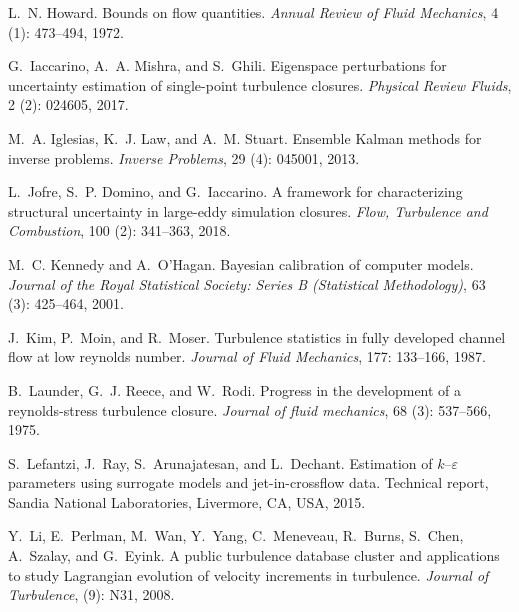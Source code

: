 \documentclass[a4paper]{ar-1col}
\begin{document}
\begin{thebibliography}{82}
L.~N. Howard.
\newblock Bounds on flow quantities.
\newblock \emph{Annual Review of Fluid Mechanics}, 4 (1):
  473--494, 1972.

G.~Iaccarino, A.~A. Mishra, and S.~Ghili.
\newblock Eigenspace perturbations for uncertainty estimation of single-point
  turbulence closures.
\newblock \emph{Physical Review Fluids}, 2 (2): 024605, 2017.

M.~A. Iglesias, K.~J. Law, and A.~M. Stuart.
\newblock Ensemble {Kalman} methods for inverse problems.
\newblock \emph{Inverse Problems}, 29 (4): 045001, 2013.

L.~Jofre, S.~P. Domino, and G.~Iaccarino.
\newblock A framework for characterizing structural uncertainty in large-eddy
  simulation closures.
\newblock \emph{Flow, Turbulence and Combustion}, 100 (2):
  341--363, 2018.

M.~C. Kennedy and A.~O'Hagan.
\newblock Bayesian calibration of computer models.
\newblock \emph{Journal of the Royal Statistical Society: Series B (Statistical
  Methodology)}, 63 (3): 425--464, 2001.

J.~Kim, P.~Moin, and R.~Moser.
\newblock Turbulence statistics in fully developed channel flow at low reynolds
  number.
\newblock \emph{Journal of Fluid Mechanics}, 177: 133--166, 1987.

B.~Launder, G.~J. Reece, and W.~Rodi.
\newblock Progress in the development of a reynolds-stress turbulence closure.
\newblock \emph{Journal of fluid mechanics}, 68 (3):
  537--566, 1975.

S.~Lefantzi, J.~Ray, S.~Arunajatesan, and L.~Dechant.
\newblock Estimation of $k$--$\varepsilon$ parameters using surrogate models
  and jet-in-crossflow data.
\newblock Technical report, Sandia National Laboratories, Livermore, CA, USA,
  2015.

Y.~Li, E.~Perlman, M.~Wan, Y.~Yang, C.~Meneveau, R.~Burns, S.~Chen, A.~Szalay,
  and G.~Eyink.
\newblock A public turbulence database cluster and applications to study
  {Lagrangian} evolution of velocity increments in turbulence.
\newblock \emph{Journal of Turbulence},  (9): N31, 2008.


\end{thebibliography}
\end{document}
